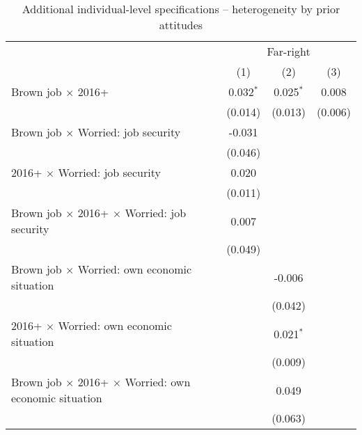 
\begin{table}[htbp]
   \caption{Additional individual-level specifications – heterogeneity by prior attitudes}
   \centering
   \begin{tabular}{lccc}
      \tabularnewline \midrule \midrule
       & \multicolumn{3}{c}{Far-right}\\
                                                                          & (1)         & (2)         & (3)\\  
      Brown job $\times$ 2016+                                            & 0.032$^{*}$ & 0.025$^{*}$ & 0.008\\   
                                                                          & (0.014)     & (0.013)     & (0.006)\\   
      Brown job $\times$ Worried: job security                            & -0.031      &             &   \\   
                                                                          & (0.046)     &             &   \\   
      2016+ $\times$ Worried: job security                                & 0.020       &             &   \\   
                                                                          & (0.011)     &             &   \\   
      Brown job $\times$ 2016+ $\times$ Worried: job security             & 0.007       &             &   \\   
                                                                          & (0.049)     &             &   \\   
      Brown job $\times$ Worried: own economic situation                  &             & -0.006      &   \\   
                                                                          &             & (0.042)     &   \\   
      2016+ $\times$ Worried: own economic situation                      &             & 0.021$^{*}$ &   \\   
                                                                          &             & (0.009)     &   \\   
      Brown job $\times$ 2016+ $\times$ Worried: own economic situation   &             & 0.049       &   \\   
                                                                          &             & (0.063)     &   \\   

\end{tabular}
\end{table}
